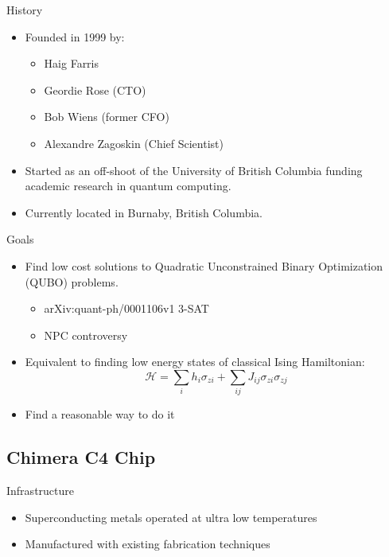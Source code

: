 \documentclass{beamer}
\begin{document}
\begin{frame}{History}
 \begin{itemize}
  \item Founded in 1999 by:
    \begin{itemize}
     \item Haig Farris
     \item Geordie Rose (CTO)
     \item Bob Wiens (former CFO)
     \item Alexandre Zagoskin (Chief Scientist)
    \end{itemize}
   \item Started as an off-shoot of the University of British Columbia funding academic research in quantum computing.
   \item Currently located in Burnaby, British Columbia.

 \end{itemize}

\end{frame}

\begin{frame}{Goals}
 
 \begin{itemize}
  \item Find low cost solutions to Quadratic Unconstrained Binary Optimization (QUBO) problems.
  \begin{itemize}
   \item arXiv:quant-ph/0001106v1 3-SAT
   \item NPC controversy
  \end{itemize}
  \item Equivalent to finding low energy states of classical Ising Hamiltonian: \[\mathcal{H} = \displaystyle\sum\limits_{i}h_i\sigma_{zi} + \displaystyle\sum\limits_{ij}J_{ij}\sigma_{zi}\sigma_{zj}\]
  \item Find a reasonable way to do it
 \end{itemize}

\end{frame}

\subsection{Chimera C4 Chip}

\begin{frame}{Infrastructure}
 \begin{itemize}
  \item Superconducting metals operated at ultra low temperatures
  \item Manufactured with existing fabrication techniques
  
 \end{itemize}

\end{frame}
\end{document}
